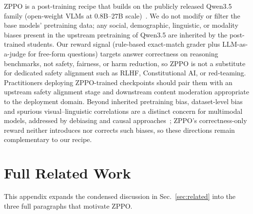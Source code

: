 \documentclass{llmxive}
\begin{document}
ZPPO is a post-training recipe that builds on the publicly released Qwen3.5 family (open-weight VLMs at $0.8$B--$27$B scale)~\citep{qwen3.5}. We do not modify or filter the base models' pretraining data; any social, demographic, linguistic, or modality biases present in the upstream pretraining of Qwen3.5 are inherited by the post-trained students. Our reward signal (rule-based exact-match grader plus LLM-as-a-judge for free-form questions) targets answer correctness on reasoning benchmarks, not safety, fairness, or harm reduction, so ZPPO is not a substitute for dedicated safety alignment such as RLHF, Constitutional AI, or red-teaming. Practitioners deploying ZPPO-trained checkpoints should pair them with an upstream safety alignment stage and downstream content moderation appropriate to the deployment domain. Beyond inherited pretraining bias, dataset-level bias and spurious visual--linguistic correlations are a distinct concern for multimodal models, addressed by debiasing and causal approaches~\citep{10222502,KIM2026112173}; ZPPO's correctness-only reward neither introduces nor corrects such biases, so these directions remain complementary to our recipe.







\appendix
\section{Full Related Work}
\label{sec:related_full}

This appendix expands the condensed discussion in Sec.~\ref{sec:related} into the three full paragraphs that motivate ZPPO.
\end{document}
